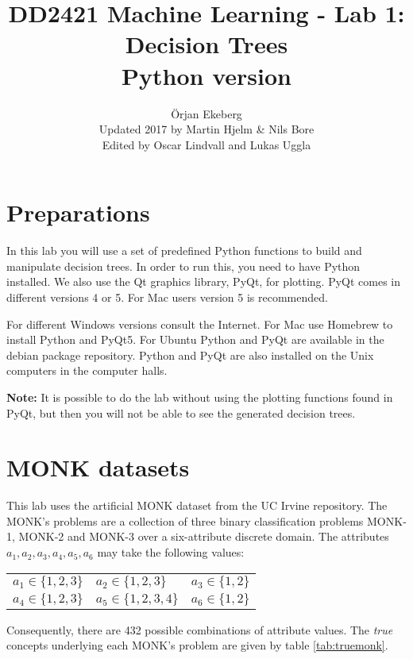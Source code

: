\documentclass[11pt]{article}
\title{\vspace{-5.0cm}DD2421 Machine Learning - Lab 1: Decision Trees \\ Python version}
\author{\"Orjan Ekeberg\\ Updated 2017 by Martin Hjelm \& Nils Bore\\Edited by Oscar Lindvall and Lukas Uggla}
\begin{document}
\maketitle

\section{Preparations}

In this lab you will use a set of predefined Python functions to
build and manipulate decision trees.  In order to run this, you
need to have Python installed.  We also use the Qt graphics library,
PyQt, for plotting. PyQt comes in different versions 4 or 5. For
Mac users version 5 is recommended. 

For different Windows versions consult the Internet. For Mac use Homebrew 
to install Python and PyQt5. For Ubuntu Python and PyQt are available in the 
debian package repository. Python and PyQt are also installed on the Unix computers in 
the computer halls.

\textbf{Note:} It is possible to do the lab without using the
plotting functions found in PyQt, but then you will not be able to see the generated
decision trees.


\section{MONK datasets}

This lab uses the artificial MONK dataset from the UC Irvine repository.
The MONK's problems are a collection of three binary classification
problems MONK-1, MONK-2 and MONK-3 over a six-attribute discrete domain.
The attributes \(a_1, a_2, a_3, a_4, a_5, a_6\) may take the following values:

\begin{center}
  \begin{tabular}{lll}
    \(a_1 \in \{1, 2, 3\}\) &
    \(a_2 \in \{1, 2, 3\}\) &
    \(a_3 \in \{1, 2\}\)\\
    \(a_4 \in \{1, 2, 3\}\) &
    \(a_5 \in \{1, 2, 3, 4\}\) &
    \(a_6 \in \{1, 2\}\)\\
  \end{tabular}
\end{center}
Consequently, there are 432 possible combinations of attribute values. 
The \emph{true} concepts underlying each MONK's problem are given by
table \ref{tab:truemonk}.
\end{document}
